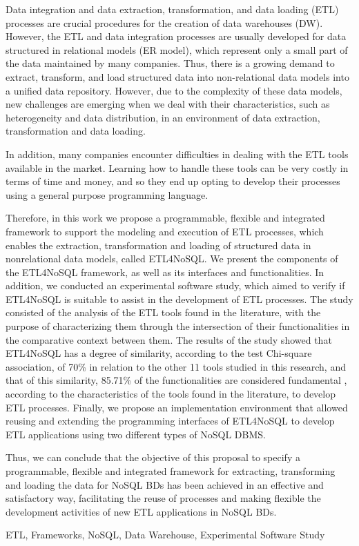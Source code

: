 Data integration and data extraction, transformation, and data loading (ETL) processes are crucial procedures for the creation of data warehouses (DW). However, the ETL and data integration processes are usually developed for data structured in relational models (ER model), which represent only a small part of the data maintained by many companies. Thus, there is a growing demand to extract, transform, and load structured data into non-relational data models into a unified data repository. However, due to the complexity of these data models, new challenges are emerging when we deal with their characteristics, such as heterogeneity and data distribution, in an environment of data extraction, transformation and data loading.

In addition, many companies encounter difficulties in dealing with the ETL tools available in the market. Learning how to handle these tools can be very costly in terms of time and money, and so they end up opting to develop their processes using a general purpose programming language.

Therefore, in this work we propose a programmable, flexible and integrated framework to support the modeling and execution of ETL processes, which enables the extraction, transformation and loading of structured data in nonrelational data models, called ETL4NoSQL. We present the components of the ETL4NoSQL framework, as well as its interfaces and functionalities. In addition, we conducted an experimental software study, which aimed to verify if ETL4NoSQL is suitable to assist in the development of ETL processes. The study consisted of the analysis of the ETL tools found in the literature, with the purpose of characterizing them through the intersection of their functionalities in the comparative context between them. The results of the study showed that ETL4NoSQL has a degree of similarity, according to the test Chi-square association, of 70\% in relation to the other 11 tools studied in this research, and that of this similarity, 85.71\% of the functionalities are considered fundamental , according to the characteristics of the tools found in the literature, to develop ETL processes. Finally, we propose an implementation environment that allowed reusing and extending the programming interfaces of ETL4NoSQL to develop ETL applications using two different types of NoSQL DBMS.

Thus, we can conclude that the objective of this proposal to specify a programmable, flexible and integrated framework for extracting, transforming and loading the data for NoSQL BDs has been achieved in an effective and satisfactory way, facilitating the reuse of processes and making flexible the development activities of new ETL applications in NoSQL BDs.

\begin{keywords}
	ETL, Frameworks, NoSQL, Data Warehouse, Experimental Software Study
\end{keywords}
